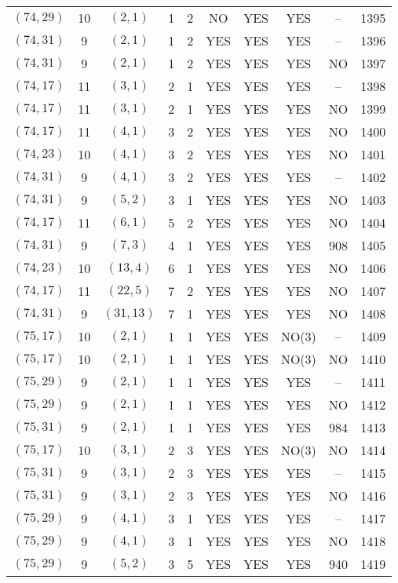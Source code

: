 \begin{longtable}{|c|c|c|c|c|c|c|c|c|c|}
$(74, 29)$ & 10 & $(2, 1)$ & 1 & 2 & NO & YES & YES & -- & 1395\\
$(74, 31)$ & 9 & $(2, 1)$ & 1 & 2 & YES & YES & YES & -- & 1396\\
$(74, 31)$ & 9 & $(2, 1)$ & 1 & 2 & YES & YES & YES & NO & 1397\\
$(74, 17)$ & 11 & $(3, 1)$ & 2 & 1 & YES & YES & YES & -- & 1398\\
$(74, 17)$ & 11 & $(3, 1)$ & 2 & 1 & YES & YES & YES & NO & 1399\\
$(74, 17)$ & 11 & $(4, 1)$ & 3 & 2 & YES & YES & YES & NO & 1400\\
$(74, 23)$ & 10 & $(4, 1)$ & 3 & 2 & YES & YES & YES & NO & 1401\\
$(74, 31)$ & 9 & $(4, 1)$ & 3 & 2 & YES & YES & YES & -- & 1402\\
$(74, 31)$ & 9 & $(5, 2)$ & 3 & 1 & YES & YES & YES & NO & 1403\\
$(74, 17)$ & 11 & $(6, 1)$ & 5 & 2 & YES & YES & YES & NO & 1404\\
$(74, 31)$ & 9 & $(7, 3)$ & 4 & 1 & YES & YES & YES & 908 & 1405\\
$(74, 23)$ & 10 & $(13, 4)$ & 6 & 1 & YES & YES & YES & NO & 1406\\
$(74, 17)$ & 11 & $(22, 5)$ & 7 & 2 & YES & YES & YES & NO & 1407\\
$(74, 31)$ & 9 & $(31, 13)$ & 7 & 1 & YES & YES & YES & NO & 1408\\
$(75, 17)$ & 10 & $(2, 1)$ & 1 & 1 & YES & YES & NO(3) & -- & 1409\\
$(75, 17)$ & 10 & $(2, 1)$ & 1 & 1 & YES & YES & NO(3) & NO & 1410\\
$(75, 29)$ & 9 & $(2, 1)$ & 1 & 1 & YES & YES & YES & -- & 1411\\
$(75, 29)$ & 9 & $(2, 1)$ & 1 & 1 & YES & YES & YES & NO & 1412\\
$(75, 31)$ & 9 & $(2, 1)$ & 1 & 1 & YES & YES & YES & 984 & 1413\\
$(75, 17)$ & 10 & $(3, 1)$ & 2 & 3 & YES & YES & NO(3) & NO & 1414\\
$(75, 31)$ & 9 & $(3, 1)$ & 2 & 3 & YES & YES & YES & -- & 1415\\
$(75, 31)$ & 9 & $(3, 1)$ & 2 & 3 & YES & YES & YES & NO & 1416\\
$(75, 29)$ & 9 & $(4, 1)$ & 3 & 1 & YES & YES & YES & -- & 1417\\
$(75, 29)$ & 9 & $(4, 1)$ & 3 & 1 & YES & YES & YES & NO & 1418\\
$(75, 29)$ & 9 & $(5, 2)$ & 3 & 5 & YES & YES & YES & 940 & 1419\\

\end{longtable}
